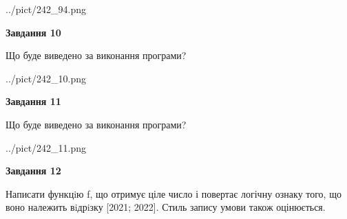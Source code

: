 \documentclass[12pt, ukrainian]{article}
\begin{document}
{\begin {large}
\begin{center}
	{../pict/242_94.png}
\end{center}
\newpage

{\begin {center}\textbf{Завдання 10}\end {center}}

Що буде виведено за виконання програми?\par
\begin{center}
	{../pict/242_10.png}
\end{center}
\newpage

{\begin {center}\textbf{Завдання 11}\end {center}}

Що буде виведено за виконання програми?\par
\begin{center}
	{../pict/242_11.png}
\end{center}
\newpage

{\begin {center}\textbf{Завдання 12}\end {center}}


Написати функцiю f, що отримує ціле число і повертає логічну ознаку того, що воно належить вiдрiзку [2021; 2022]. Стиль запису умови також оцінюється.\par
\newpage

\end {large}}
\end{document}

